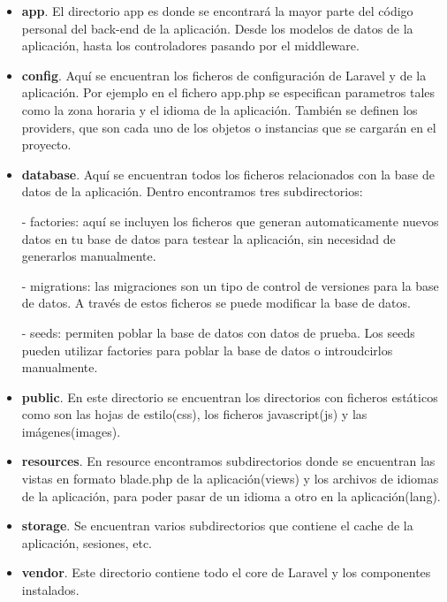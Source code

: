 \begin{itemize}

\item \textbf{app}. El directorio app es donde se encontrará la mayor parte del código personal del back-end de la aplicación. Desde los modelos de datos de la aplicación, hasta los controladores pasando por el middleware.

\item \textbf{config}. Aquí se encuentran los ficheros de configuración de Laravel y de la aplicación. Por ejemplo en el fichero app.php se especifican parametros tales como la zona horaria y el idioma de la aplicación. También se definen los providers, que son cada uno de los objetos o instancias que se cargarán en el proyecto.

\item \textbf{database}. Aquí se encuentran todos los ficheros relacionados con la base de datos de la aplicación. Dentro encontramos tres subdirectorios:

- factories: aquí se incluyen los ficheros que generan automaticamente nuevos datos en tu base de datos para testear la aplicación, sin necesidad de generarlos manualmente.

- migrations: las migraciones son un tipo de control de versiones para la base de datos. A través de estos ficheros se puede modificar la base de datos.

- seeds: permiten poblar la base de datos con datos de prueba. Los seeds pueden utilizar factories para poblar la base de datos o introudcirlos manualmente.

\item \textbf{public}. En este directorio se encuentran los directorios con ficheros estáticos como son las hojas de estilo(css), los ficheros javascript(js) y las imágenes(images).

\item \textbf{resources}. En resource encontramos subdirectorios donde se encuentran las vistas  en formato blade.php de la aplicación(views) y los archivos de idiomas de la aplicación, para poder pasar de un idioma a otro en la aplicación(lang).

\item \textbf{storage}. Se encuentran varios subdirectorios que contiene el cache de la aplicación, sesiones, etc.

\item \textbf{vendor}. Este directorio contiene todo el core de Laravel y los componentes instalados.

\end{itemize}



